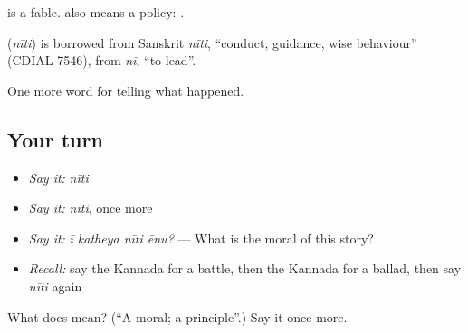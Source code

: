  is a fable.  also means a policy:  .

\begin{cousinweb}
\textbf{} (\emph{nīti}) is borrowed from Sanskrit \emph{nīti}, \textquotedblleft{}conduct, guidance, wise behaviour\textquotedblright{} (CDIAL 7546), from \emph{nī}, \textquotedblleft{}to lead\textquotedblright{}.
\end{cousinweb}

\begin{grammarlens}[title={What you've built}]
One more word for telling what happened.
\end{grammarlens}

\subsection*{Your turn}
\begin{itemize}
\raggedright
  \item \emph{Say it:} \emph{nīti}
  \item \emph{Say it:} \emph{nīti}, once more
  \item \emph{Say it:} \emph{ī katheya nīti ēnu?} — What is the moral of this story?
  \item \emph{Recall:} say the Kannada for a battle, then the Kannada for a ballad, then say \emph{nīti} again
\end{itemize}

\begin{tcolorbox}[breakable,colback=teal!4,colframe=teal!35!black,title={Before you move on}]
What does  mean? (\textquotedblleft{}A moral; a principle\textquotedblright{}.) Say it once more.
\end{tcolorbox}
